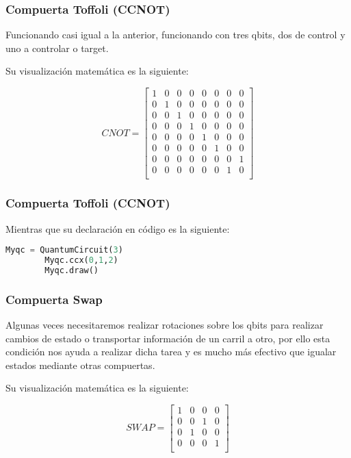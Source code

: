 \documentclass[spanish]{beamer}
\begin{document}
    \newpage\begin{frame}[fragile]
     \frametitle{Compuerta Toffoli (CCNOT)}
     Funcionando casi igual a la anterior, funcionando con tres qbits, dos de control y uno a controlar o target.
     
     Su visualización matemática es la siguiente:
     
      \begin{equation}
        CNOT =\begin{bmatrix}
            1 & 0 & 0 & 0 & 0 & 0 & 0 & 0\\
            0 & 1 & 0 & 0 & 0 & 0 & 0 & 0\\
            0 & 0 & 1 & 0 & 0 & 0 & 0 & 0\\
            0 & 0 & 0 & 1 & 0 & 0 & 0 & 0\\
            0 & 0 & 0 & 0 & 1 & 0 & 0 & 0\\
            0 & 0 & 0 & 0 & 0 & 1 & 0 & 0\\
            0 & 0 & 0 & 0 & 0 & 0 & 0 & 1\\
            0 & 0 & 0 & 0 & 0 & 0 & 1 & 0\\
        \end{bmatrix}
        \end{equation}
     \end{frame}
     \newpage\begin{frame}[fragile]
     \frametitle{Compuerta Toffoli (CCNOT)}
     
    Mientras que su declaración en código es la siguiente:
     
    \begin{lstlisting}[language=Python]
        Myqc = QuantumCircuit(3)
        Myqc.ccx(0,1,2)
        Myqc.draw() \end{lstlisting}
     \end{frame} 
    \newpage\begin{frame}[fragile]
     \frametitle{Compuerta Swap}
   Algunas veces necesitaremos realizar rotaciones sobre los qbits para realizar cambios de estado o transportar información de un carril a otro, por ello esta condición nos ayuda a realizar dicha tarea y es mucho más efectivo que igualar estados mediante otras compuertas.
     
    Su visualización matemática es la siguiente:
     
       \begin{equation}
        SWAP =\begin{bmatrix}
            1 & 0 & 0 & 0\\
            0 & 0 & 1 & 0\\
            0 & 1 & 0 & 0\\
            0 & 0 & 0 & 1\\
        \end{bmatrix}
        \end{equation}
    \end{frame}  
\end{document}
